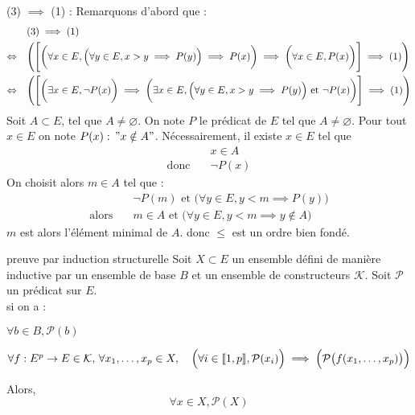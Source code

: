 \begin{demonstration}
    \item (3) $\implies$ (1) : Remarquons d'abord que : 
    \begin{align*}
        &\text{(3)} \implies \text{(1)} \\
        \Leftrightarrow  \quad &\Biggl(\Biggl[\biggl(\forall x \in E, \Bigl(\forall y \in E, x>y \implies P(y)\Bigr) \implies P(x)\biggr) \implies \biggl(\forall x \in E, P(x)\biggr) \Biggr] \implies \text{(1)} \Biggr)\\
        \Leftrightarrow \quad &\Biggl( \Biggl[\biggl(\exists x \in E, \lnot P(x)\biggr) \implies \biggl(\exists x \in E, \Bigl(\forall y \in E, x>y \implies P(y)\Bigr) \text{ et } \lnot P(x)\biggr)\Biggr] \implies \text{(1)}\Biggr)
    \end{align*}
    Soit $A \subset E$, tel que $A \neq \varnothing$. On note $P$ le prédicat de $E$ tel que $A \neq \varnothing$. Pour tout $x \in E$ on note $P(x) : \,  "x \notin A"$. Nécessairement, il existe $x \in E$ tel que \begin{align*}
        &x \in A \\
        \text{donc} \quad &\lnot P(x)
    \end{align*}
    On choisit alors $m \in A$ tel que : \begin{align*}
        &\lnot P(m) \text{ et } \bigl( \forall y \in E, y<m \implies P(y) \bigr)\\
        \text{alors} \quad &m \in A \text{ et } \bigl( \forall y \in E, y<m \implies y \notin A \bigr)
    \end{align*}
    $m$ est alors l'élément minimal de $A$. donc $\leq$ est un ordre bien fondé.
\end{demonstration}

\begin{theoreme}{6.48}{preuve par induction structurelle}
    Soit $X \subset E$ un ensemble défini de manière inductive par un ensemble de base $B$ et un ensemble de constructeurs $\mathcal{K}$. Soit $\mathcal{P}$ un prédicat sur $E$. \\ si on a : \begin{enumeratebf}
        \item $\forall b \in B, \mathcal{P}(b)$
        \item $\forall f : E^p \rightarrow E \in \mathcal{K}, \, \forall x_1,\ldots, x_p \in X, \quad \Bigl(\forall i \in \llbracket 1,p \rrbracket, \mathcal{P}(x_i)\Bigr) \implies \Bigl(\mathcal{P}\bigl(f(x_1,\ldots,x_p)\bigr)\Bigr)$
    \end{enumeratebf}
    Alors, $$\forall x \in X, \mathcal{P}(X)$$
\end{theoreme}

